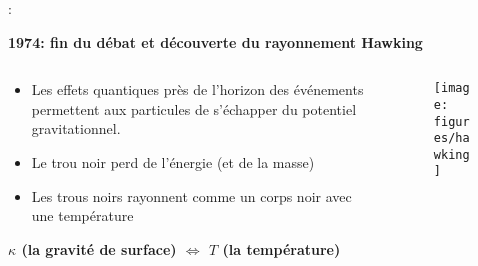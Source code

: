 \begin{frame}{\underline{\secname} : {\small \subsecname}}


\begin{center}
	\textbf{1974: fin du débat et découverte du rayonnement Hawking}
\end{center}

\begin{columns}
	\begin{column}{0.6\linewidth}

\begin{itemize}
			 \setlength\itemsep{0.5em}
	\item Les effets quantiques près de l'horizon des événements permettent aux particules de s'échapper du potentiel gravitationnel.

\item Le trou noir perd de l'énergie (et de la masse) 

\item Les trous noirs rayonnent comme un corps noir avec une température
\end{itemize}

\begin{center}
\textbf{	{\large $\kappa$ (la gravité de surface)   $\Leftrightarrow$     $T$ (la température)}}
\end{center}

\end{column}
\begin{column}{0.4\linewidth}
	
      \begin{figure}
	\centering
	\texttt{[image: figures/hawking]}
\end{figure}

\end{column}
\end{columns}

\end{frame}
